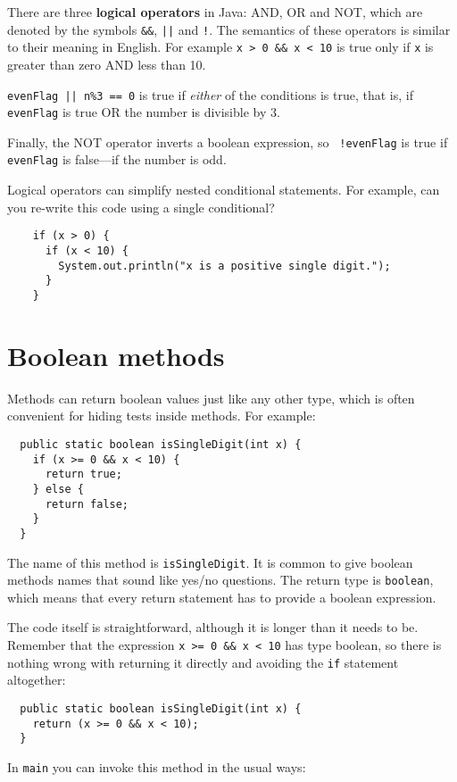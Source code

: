 \documentclass[12pt]{book}
\theoremstyle{definition}
\begin{document}
There are three {\bf logical operators} in Java: AND, OR and NOT,
which are denoted by the symbols {\tt \&\&}, {\tt ||} and
{\tt !}.  The semantics of these operators is similar
to their meaning in English.  For example {\tt x > 0 \&\& x < 10}
is true only if {\tt x} is greater than zero AND less than 10.

{\tt evenFlag || n\%3 == 0} is true if {\em either} of
the conditions is true, that is, if {\tt evenFlag} is true OR the
number is divisible by 3.

Finally, the NOT operator inverts a boolean expression, so {\tt
  !evenFlag} is true if {\tt evenFlag} is false---if the number is
odd.


Logical operators can simplify nested
conditional statements.  For example, can you re-write
this code using a single conditional?

\begin{lstlisting}
    if (x > 0) {
      if (x < 10) {
        System.out.println("x is a positive single digit.");
      }
    }
\end{lstlisting}


\section{Boolean methods}
\label{boolean}

Methods can return boolean values just like any other type,
which is often convenient for hiding tests inside
methods.  For example:

\begin{lstlisting}
  public static boolean isSingleDigit(int x) {
    if (x >= 0 && x < 10) {
      return true;
    } else {
      return false;
    }
  }
\end{lstlisting}
%
The name of this method is {\tt isSingleDigit}.  It is common
to give boolean methods names that sound like yes/no questions.
The return type is {\tt boolean}, which means that every return
statement has to provide a boolean expression.

The code itself is straightforward, although it is longer than
it needs to be.  Remember that the expression {\tt x >= 0 \&\& x < 10}
has type boolean, so there is nothing wrong with returning it
directly and avoiding the {\tt if} statement altogether:

\begin{lstlisting}
  public static boolean isSingleDigit(int x) {
    return (x >= 0 && x < 10);
  }
\end{lstlisting}
%
In {\tt main} you can invoke this method in the usual ways:
\end{document}
